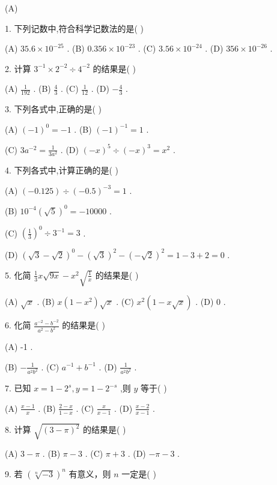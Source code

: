 \documentclass[10pt]{article}
\begin{document}
(A)

1. 下列记数中,符合科学记数法的是( )

(A) \({35.6} \times  {10}^{-{25}}\) . (B) \({0.356} \times  {10}^{-{23}}\) . (C) \({3.56} \times  {10}^{-{24}}\) . (D) \({356} \times  {10}^{-{26}}\) .

2. 计算 \({3}^{-1} \times  {2}^{-2} \div  {4}^{-2}\) 的结果是( )

(A) \(\frac{1}{192}\) . (B) \(\frac{4}{3}\) . (C) \(\frac{1}{12}\) . (D) \(- \frac{4}{3}\) .

3. 下列各式中,正确的是( )

(A) \({\left( -1\right) }^{0} =  - 1\) . (B) \({\left( -1\right) }^{-1} = 1\) .

(C) \(3{a}^{-2} = \frac{1}{3{a}^{2}}\) . (D) \({\left( -x\right) }^{5} \div  {\left( -x\right) }^{3} = {x}^{2}\) .

4. 下列各式中,计算正确的是( )

(A) \(\left( {-{0.125}}\right)  \div  {\left( -{0.5}\right) }^{-3} = 1\) .

(B) \({10}^{-4}{\left( \sqrt{5}\right) }^{0} =  - {10000}\) .

(C) \({\left( \frac{1}{3}\right) }^{0} \div  {3}^{-1} = 3\) .

(D) \({\left( \sqrt{3} - \sqrt{2}\right) }^{0} - {\left( \sqrt{3}\right) }^{2} - {\left( -\sqrt{2}\right) }^{2} = 1 - 3 + 2 = 0\) .

5. 化简 \(\frac{1}{3}x\sqrt{9x} - {x}^{2}\sqrt{\frac{1}{x}}\) 的结果是( )

(A) \(\sqrt{x}\) . (B) \(x\left( {1 - {x}^{2}}\right) \sqrt{x}\) . (C) \({x}^{2}\left( {1 - x\sqrt{x}}\right)\) . (D) 0 .

6. 化简 \(\frac{{a}^{-2} - {b}^{-2}}{{a}^{2} - {b}^{2}}\) 的结果是( )

(A) -1 .

(B) \(- \frac{1}{{a}^{2}{b}^{2}}\) . (C) \({a}^{-1} + {b}^{-1}\) . (D) \(\frac{1}{{a}^{2}{b}^{2}}\) .

7. 已知 \(x = 1 - {2}^{s},y = 1 - {2}^{-s}\) ,则 \(y\) 等于( )

(A) \(\frac{x - 1}{x}\) . (B) \(\frac{2 - x}{1 - x}\) . (C) \(\frac{x}{x - 1}\) . (D) \(\frac{x - 2}{x - 1}\) .

8. 计算 \(\sqrt{{\left( 3 - \pi \right) }^{2}}\) 的结果是( )

(A) \(3 - \pi\) . (B) \(\pi  - 3\) . (C) \(\pi  + 3\) . (D) \(- \pi  - 3\) .

9. 若 \({\left( \sqrt[n]{-3}\right) }^{n}\) 有意义，则 \(n\) 一定是( )
\end{document}
